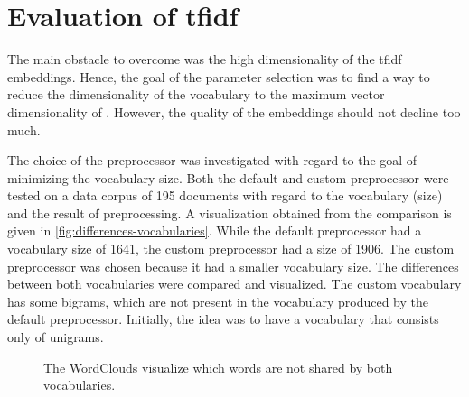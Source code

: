 \section{Evaluation of \acs{tfidf}}\label{sec:evaluation-tfidf}

The main obstacle to overcome was the high dimensionality of the \ac{tfidf} embeddings.
Hence, the goal of the parameter selection was to find a way to reduce the dimensionality of the vocabulary to the maximum vector dimensionality of \databaseName{}.
However, the quality of the embeddings should not decline too much.

The choice of the preprocessor was investigated with regard to the goal of minimizing the vocabulary size.
Both the default and custom preprocessor were tested on a data corpus of 195 documents with regard to the vocabulary (size) and the result of preprocessing.
A visualization obtained from the comparison is given in \autoref{fig:differences-vocabularies}.
While the default preprocessor had a vocabulary size of 1641, the custom preprocessor had a size of 1906.
The custom preprocessor was chosen because it had a smaller vocabulary size.
The differences between both vocabularies were compared and visualized.
The custom vocabulary has some bigrams, which are not present in the vocabulary produced by the default preprocessor.
Initially, the idea was to have a vocabulary that consists only of unigrams.

\begin{figure}%
    \centering
    \qquad
    \caption{The WordClouds visualize which words are not shared by both vocabularies.}%
    \label{fig:differences-vocabularies}%
\end{figure}

